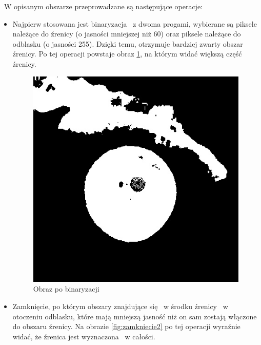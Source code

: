 ~W opisanym obszarze przeprowadzane są następujące operacje:
\begin{itemize}
\item Najpierw stosowana jest binaryzacja ~z dwoma progami, wybierane są piksele należące do źrenicy (o jasności mniejszej niż 60) oraz piksele należące do odblasku (o jasności 255). Dzięki temu, otrzymuje bardziej zwarty obszar źrenicy. Po tej operacji powstaje obraz \ref{fig:binaryzacja2}, na którym widać większą część źrenicy.
\begin{figure}
\begin{center}
\includegraphics[scale=0.5]{binaryzacja2.jpg}
\caption{Obraz po binaryzacji}
\label{fig:binaryzacja2}
\end{center}
\end{figure}
\item Zamknięcie, po którym obszary znajdujące się ~w środku źrenicy ~w otoczeniu odblasku, które mają mniejszą jasność niż on sam zostają włączone do obszaru źrenicy. Na obrazie \ref{fig:zamkniecie2} po tej operacji wyraźnie widać, że źrenica jest wyznaczona ~w całości.
\begin{figure}
\begin{center}

\end{center}
\end{figure}
\end{itemize}
